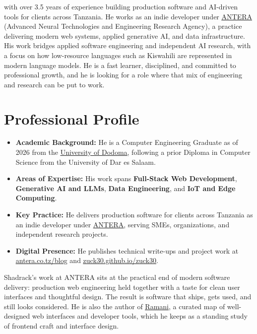 \documentclass[12pt]{article}
\newcommand{\hlink}[2]{\href{#1}{\textcolor{linkblue}{\underline{#2}}}}
\begin{document}
 with over 3.5 years of experience building production software and AI-driven tools for clients across Tanzania. He works as an indie developer under \hlink{https://antera.co.tz}{ANTERA} (Advanced Neural Technologies and Engineering Research Agency), a practice delivering modern web systems, applied generative AI, and data infrastructure. His work bridges applied software engineering and independent AI research, with a focus on how low-resource languages such as Kiswahili are represented in modern language models. He is a fast learner, disciplined, and committed to professional growth, and he is looking for a role where that mix of engineering and research can be put to work.

\section*{Professional Profile}
\begin{itemize}
    \item \textbf{Academic Background:} He is a Computer Engineering Graduate as of 2026 from the \hlink{https://www.udom.ac.tz}{University of Dodoma}, following a prior Diploma in Computer Science from the University of Dar es Salaam.
    \item \textbf{Areas of Expertise:} His work spans \textbf{Full-Stack Web Development}, \textbf{Generative AI and LLMs}, \textbf{Data Engineering}, and \textbf{IoT and Edge Computing}.
    \item \textbf{Key Practice:} He delivers production software for clients across Tanzania as an indie developer under \hlink{https://antera.co.tz}{ANTERA}, serving SMEs, organizations, and independent research projects.
    \item \textbf{Digital Presence:} He publishes technical write-ups and project work at \hlink{https://antera.co.tz/blog}{antera.co.tz/blog} and \hlink{https://zuck30.github.io/zuck30}{zuck30.github.io/zuck30}.
\end{itemize}

\vspace{6pt}
\noindent Shadrack's work at ANTERA sits at the practical end of modern software delivery: production web engineering held together with a taste for clean user interfaces and thoughtful design. The result is software that ships, gets used, and still looks considered. He is also the author of \hlink{https://zuck30.github.io/ramani/}{Ramani}, a curated map of well-designed web interfaces and developer tools, which he keeps as a standing study of frontend craft and interface design.
\end{document}
